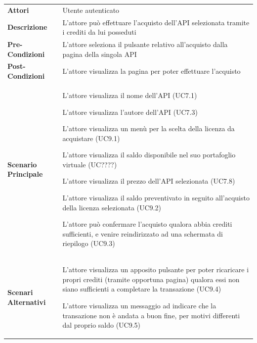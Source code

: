 \begin{longtable}{ l | p{11cm}}
	\hline
	\rowcolor{Gray}
	\multicolumn{2}{c}{UC9 - Acquisto API}\\
	\hline
	
	 \textbf{Attori} & Utente autenticato  \\
	\textbf{Descrizione} & L'attore può effettuare l'acquisto dell'API selezionata tramite i crediti da lui posseduti \\
	\textbf{Pre-Condizioni} & L'attore seleziona il pulsante relativo all'acquisto dalla pagina della singola API  \\
	\textbf{Post-Condizioni} & L'attore visualizza la pagina per poter effettuare l'acquisto\\
	\textbf{Scenario Principale} & 
	\begin{enumerate*}[label=(\arabic*.),itemjoin={\newline}]
		\item L'attore visualizza il nome dell'API (UC7.1)
		\item L'attore visualizza l'autore dell'API (UC7.3)
		\item L'attore visualizza un menù per la scelta della licenza da acquistare (UC9.1)
		\item L'attore visualizza il saldo disponibile nel suo portafoglio virtuale (UC????)
		\item L'attore visualizza il prezzo dell'API selezionata (UC7.8)
		\item L'attore visualizza il saldo preventivato in seguito all'acquisto della licenza selezionata (UC9.2)
		\item L'attore può confermare l'acquisto qualora abbia crediti sufficienti, e venire reindirizzato ad una schermata di riepilogo (UC9.3)
	\end{enumerate*}\\
	\textbf{Scenari Alternativi} & 
	\begin{enumerate*}[label=(\arabic*.),itemjoin={\newline}]
		\item L'attore visualizza un apposito pulsante per poter ricaricare i propri crediti (tramite opportuna pagina) qualora essi non siano sufficienti a completare la transazione (UC9.4)
		\item L'attore visualizza un messaggio ad indicare che la transazione non è andata a buon fine, per motivi differenti dal proprio saldo (UC9.5)
	\end{enumerate*}\\
\end{longtable}


